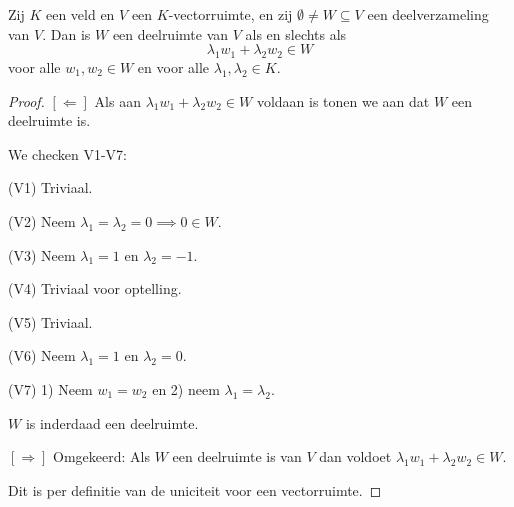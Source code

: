\begin{lemma}[2.2.3]
    Zij $K$ een veld en $V$ een $K$-vectorruimte, en zij $\emptyset \neq W \subseteq V$ een deelverzameling van $V$. Dan is $W$ een deelruimte van $V$ als en slechts als
    \[ \lambda_1 w_1 + \lambda_2 w_2 \in W \]
    voor alle $w_1, w_2 \in W$ en voor alle $\lambda_1, \lambda_2 \in K$.
\end{lemma}
\begin{proof}

    \([\Leftarrow]\) Als aan \( \lambda_1 w_1 + \lambda_2 w_2 \in W \) voldaan is tonen we aan dat \(W\) een deelruimte is.

    We checken V1-V7:

    (V1) Triviaal.

    (V2) Neem \(\lambda_1 = \lambda_2 = 0 \implies 0 \in W \).

    (V3) Neem \(\lambda_1 = 1 \) en \( \lambda_2 = -1\).

    (V4) Triviaal voor optelling.

    (V5) Triviaal.

    (V6) Neem \(\lambda_1 = 1\) en \(\lambda_2 = 0\).

    (V7) 1) Neem \(w_1 = w_2\) en 2) neem \(\lambda_1 = \lambda_2\).

    \(W\) is inderdaad een deelruimte.

    \([\Rightarrow]\) Omgekeerd: Als \(W\) een deelruimte is van \(V\) dan voldoet 
    \( \lambda_1 w_1 + \lambda_2 w_2 \in W .\)

    Dit is per definitie van de uniciteit voor een vectorruimte.
\end{proof}

